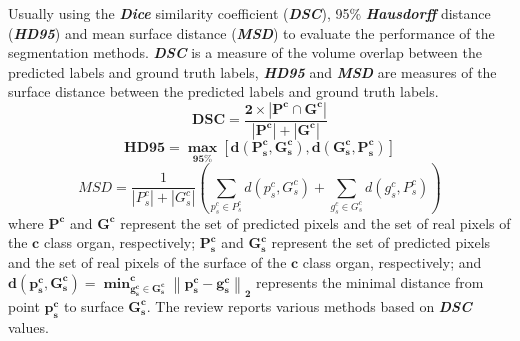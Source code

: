\documentclass[lettersize,journal]{IEEEtran}
\begin{document}
Usually using the \textit{\textbf{Dice}} similarity coefficient (\textit{\textbf{DSC}}), 95\% \textit{\textbf{Hausdorff}} distance (\textit{\textbf{HD95}}) and mean surface distance (\textit{\textbf{MSD}}) to evaluate the performance of the segmentation methods. \textit{\textbf{DSC}} is a measure of the volume overlap between the predicted labels and ground truth labels, \textit{\textbf{HD95}} and \textit{\textbf{MSD}} are measures of the surface distance between the predicted labels and ground truth labels.
\begin{equation}\label{eq1}
\boldsymbol{D S C=\dfrac{2 \times\left|P^c \cap G^c\right|}{\left|P^c\right|+\left|G^c\right|}}
\end{equation}
\begin{equation}\label{eq2}
\boldsymbol{H D 95=\max _{95 \%}\left[d\left(P_s^c, G_s^c\right), d\left(G_s^c, P_s^c\right)\right]}
\end{equation}
\begin{equation}\label{eq3}
M S D=\frac{1}{\left|P_s^c\right|+\left|G_s^c\right|}\left(\sum_{p_s^c \in P_s^c} d\left(p_s^c, G_s^c\right)+\sum_{g_s^c \in G_s^c} d\left(g_s^c, P_s^c\right)\right)
\end{equation}
where $\boldsymbol{P}^{\boldsymbol{c}}$ and $\boldsymbol{G}^{\boldsymbol{c}}$ represent the set of predicted pixels and the set of real pixels of the $\boldsymbol{c}$ class organ, respectively; $\boldsymbol{P_s^c}$ and $\boldsymbol{G_s^c}$ represent the set of predicted pixels and the set of real pixels of the surface of the $\boldsymbol{c}$ class organ, respectively; and $\boldsymbol{d\left(p_s^c, G_s^c\right)=\min _{g_s^c \in G_s^c}^c\left\|p_s^c-g_s^c\right\|_2}$ represents the minimal distance from point $\boldsymbol{p_s^c}$ to surface $\boldsymbol{G_s^c}$. The review reports various methods based on \textit{\textbf{DSC}} values.
\end{document}
